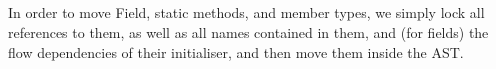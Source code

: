 \subsection{}
In order to move Field, static methods, and member types, we simply lock all references to them, as well as all names contained in them, and (for fields) the flow dependencies of their initialiser, and then move them inside the AST.
